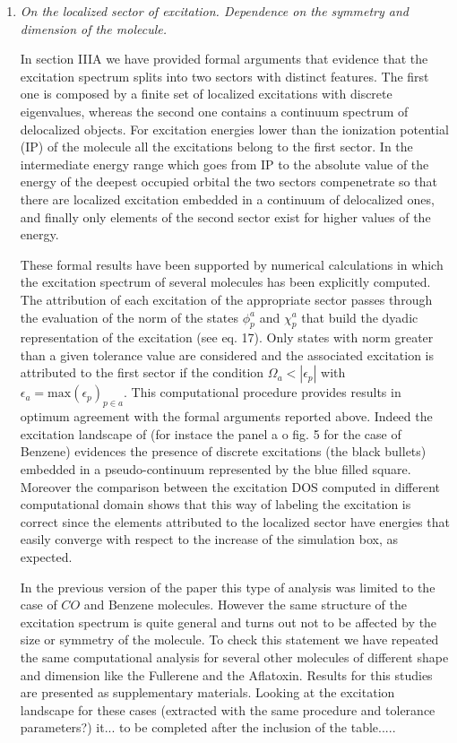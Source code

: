 \documentclass[11pt,a4paper]{article}
\begin{document}
\begin{enumerate}
  
 \item \emph{On the localized sector of excitation. Dependence on the symmetry and dimension of the molecule.}
 
 In section IIIA we have provided formal arguments that evidence that the excitation spectrum splits into two sectors with distinct features. The first one
 is composed by a finite set of localized excitations with discrete eigenvalues, whereas the second one contains a continuum spectrum of delocalized objects.
 For excitation energies lower than the ionization potential (IP) of the molecule all the excitations belong to the first sector. In the intermediate energy range which goes from IP to the absolute value of the energy of the deepest occupied orbital the two sectors compenetrate so that there are localized excitation embedded in a continuum of delocalized ones, and finally only elements of the second sector exist for higher values of the energy. 
 
 These formal results have been supported by numerical calculations in which the excitation spectrum of several molecules has been explicitly computed.
 The attribution of each excitation of the appropriate sector passes through the evaluation of the norm of the states $\phi_p^a$ and $\chi_p^a$ that build
 the dyadic representation of the excitation (see eq. 17). Only states with norm greater than a given tolerance value are considered and the associated 
 excitation is attributed to the first sector if the condition $\Omega_a < |\epsilon_p|$ with $\epsilon_a = \mathrm{max}\left(\epsilon_p\right)_{p\in a}$.
 This computational procedure provides results in optimum agreement with the formal arguments reported above. Indeed the excitation landscape of 
 (for instace the panel a o fig. 5 for the case of Benzene) evidences the presence of discrete excitations (the black bullets) embedded in a pseudo-continuum 
 represented by the blue filled square. Moreover the comparison between the excitation DOS computed in different computational domain shows that this way of labeling the excitation is correct since the elements attributed to the localized sector have energies that easily converge with respect to the increase of the simulation box, as expected.  
 
 In the previous version of the paper this type of analysis was limited to the case of $CO$ and Benzene molecules. However the same structure of the excitation spectrum is quite general and turns out not to be affected by the size or symmetry of the molecule. To check this statement we have repeated
 the same computational analysis for several other molecules of different shape and dimension like the Fullerene and the Aflatoxin. Results for this studies 
 are presented as supplementary materials. Looking at the excitation landscape for these cases (extracted with the same procedure and tolerance parameters?) it...
 to be completed after the inclusion of the table.....
 

\end{enumerate}
\end{document}
